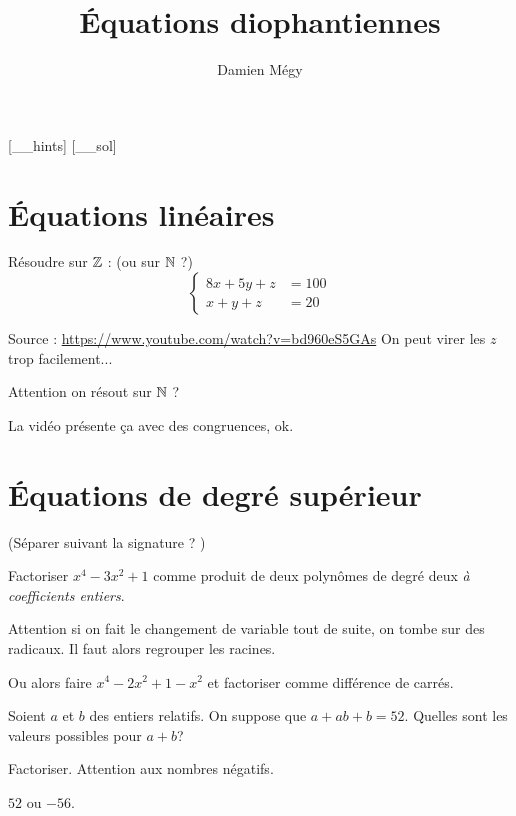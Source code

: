





[_\jobname_hints]
[_\jobname_sol]


\title{Équations diophantiennes}
\author{Damien Mégy}
\maketitle
\avertissement
\section{Équations linéaires}


\begin{exo}
Résoudre sur $\mathbb Z$ :  (ou sur $\mathbb N$ ?)
\[ \begin{cases}
8x+5y+z&=100\\
x+y+z&=20
\end{cases}\]
\begin{hint}
\end{hint}
\begin{sol}
Source : \url{https://www.youtube.com/watch?v=bd960eS5GAs}
On peut virer les $z$ trop facilement...

Attention on résout sur $\mathbb N$ ?

La vidéo présente ça avec des congruences, ok.
\end{sol}
\end{exo}

\section{Équations de degré supérieur}

(Séparer suivant la signature ? )

\begin{exo}
Factoriser $x^4-3x^2+1$ comme produit de deux polynômes de degré deux \emph{à coefficients entiers}.
\begin{hint}
Attention si on fait le changement de variable tout de suite, on tombe sur des radicaux. Il faut alors regrouper les racines.

Ou alors faire $x^4-2x^2+1 -x^2$ et factoriser comme différence de carrés.
\end{hint}
\begin{sol}
\end{sol}
\end{exo}

\begin{exo}
Soient $a$ et $b$ des entiers relatifs. On suppose que $a+ab+b=52$.
Quelles sont les valeurs possibles pour $a+b$?
\begin{hint}
Factoriser. Attention aux nombres négatifs.
\end{hint}
\begin{sol}
$52$ ou $-56$.
\end{sol}
\end{exo}


